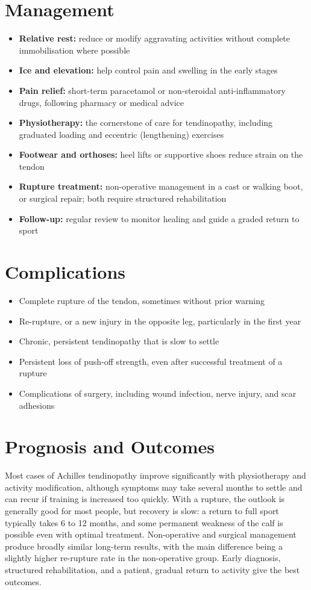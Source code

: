 \section*{Management}
\begin{itemize}
    \item \textbf{Relative rest:} reduce or modify aggravating activities without complete immobilisation where possible
    \item \textbf{Ice and elevation:} help control pain and swelling in the early stages
    \item \textbf{Pain relief:} short-term paracetamol or non-steroidal anti-inflammatory drugs, following pharmacy or medical advice
    \item \textbf{Physiotherapy:} the cornerstone of care for tendinopathy, including graduated loading and eccentric (lengthening) exercises
    \item \textbf{Footwear and orthoses:} heel lifts or supportive shoes reduce strain on the tendon
    \item \textbf{Rupture treatment:} non-operative management in a cast or walking boot, or surgical repair; both require structured rehabilitation
    \item \textbf{Follow-up:} regular review to monitor healing and guide a graded return to sport
\end{itemize}

\section*{Complications}
\begin{itemize}
    \item Complete rupture of the tendon, sometimes without prior warning
    \item Re-rupture, or a new injury in the opposite leg, particularly in the first year
    \item Chronic, persistent tendinopathy that is slow to settle
    \item Persistent loss of push-off strength, even after successful treatment of a rupture
    \item Complications of surgery, including wound infection, nerve injury, and scar adhesions
\end{itemize}

\section*{Prognosis and Outcomes}
Most cases of Achilles tendinopathy improve significantly with physiotherapy and activity modification, although symptoms may take several months to settle and can recur if training is increased too quickly. With a rupture, the outlook is generally good for most people, but recovery is slow: a return to full sport typically takes 6 to 12 months, and some permanent weakness of the calf is possible even with optimal treatment. Non-operative and surgical management produce broadly similar long-term results, with the main difference being a slightly higher re-rupture rate in the non-operative group. Early diagnosis, structured rehabilitation, and a patient, gradual return to activity give the best outcomes.

